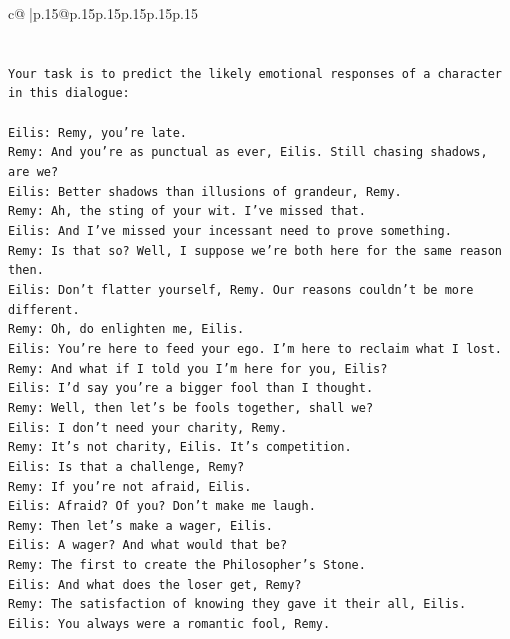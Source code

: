 \documentclass{article}
\begin{document}
{\begin{supertabular}{c@{$\;$}|p{.15\linewidth}@{}p{.15\linewidth}p{.15\linewidth}p{.15\linewidth}p{.15\linewidth}p{.15\linewidth}}
{{{\\ 
\\ 
\\ 
\texttt{Your task is to predict the likely emotional responses of a character in this dialogue:} \\
\\ 
\texttt{Eilis: Remy, you're late.} \\
\texttt{Remy: And you're as punctual as ever, Eilis. Still chasing shadows, are we?} \\
\texttt{Eilis: Better shadows than illusions of grandeur, Remy.} \\
\texttt{Remy: Ah, the sting of your wit. I've missed that. } \\
\texttt{Eilis: And I've missed your incessant need to prove something.} \\
\texttt{Remy: Is that so? Well, I suppose we're both here for the same reason then.} \\
\texttt{Eilis: Don't flatter yourself, Remy. Our reasons couldn't be more different.} \\
\texttt{Remy: Oh, do enlighten me, Eilis. } \\
\texttt{Eilis: You're here to feed your ego. I'm here to reclaim what I lost.} \\
\texttt{Remy: And what if I told you I'm here for you, Eilis?} \\
\texttt{Eilis: I'd say you're a bigger fool than I thought.} \\
\texttt{Remy: Well, then let's be fools together, shall we? } \\
\texttt{Eilis: I don't need your charity, Remy.} \\
\texttt{Remy: It's not charity, Eilis. It's competition. } \\
\texttt{Eilis: Is that a challenge, Remy?} \\
\texttt{Remy: If you're not afraid, Eilis.} \\
\texttt{Eilis: Afraid? Of you? Don't make me laugh.} \\
\texttt{Remy: Then let's make a wager, Eilis. } \\
\texttt{Eilis: A wager? And what would that be?} \\
\texttt{Remy: The first to create the Philosopher's Stone.} \\
\texttt{Eilis: And what does the loser get, Remy?} \\
\texttt{Remy: The satisfaction of knowing they gave it their all, Eilis.} \\
\texttt{Eilis: You always were a romantic fool, Remy.} \\
}}}
\end{supertabular}}
\end{document}
